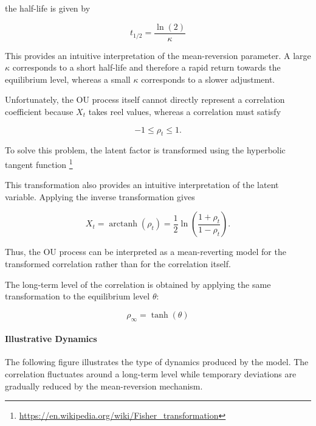 \documentclass{article}
\begin{document}
the half-life is given by

\begin{equation}
\boxed{
t_{1/2}
=
\frac{\ln(2)}{\kappa}
}
\end{equation}

This provides an intuitive interpretation of the mean-reversion
parameter. A large $\kappa$ corresponds to a short half-life and
therefore a rapid return towards the equilibrium level, whereas a
small $\kappa$ corresponds to a slower adjustment.


Unfortunately, the OU process itself cannot directly represent a correlation coefficient because $X_t$ takes reel values, whereas a correlation must satisfy

\begin{equation}
-1\leq\rho_t\leq1.
\end{equation}

To solve this problem, the latent factor is transformed using the
hyperbolic tangent function \footnote{\url{https://en.wikipedia.org/wiki/Fisher_transformation}}


This transformation also provides an intuitive interpretation of the
latent variable. Applying the inverse transformation gives

\begin{equation}
X_t
=
\operatorname{arctanh}(\rho_t)
=
\frac{1}{2}
\ln
\left(
\frac{1+\rho_t}{1-\rho_t}
\right).
\end{equation}

Thus, the OU process can be interpreted as a mean-reverting model for
the transformed correlation rather than for the correlation itself.

The long-term level of the correlation is obtained by applying the
same transformation to the equilibrium level $\theta$:

\begin{equation}
\boxed{
\rho_{\infty}
=
\tanh(\theta)
}
\end{equation}

\paragraph{Illustrative Dynamics}

The following figure illustrates the type of dynamics produced by the
model. The correlation fluctuates around a long-term level while
temporary deviations are gradually reduced by the mean-reversion
mechanism.
\end{document}
